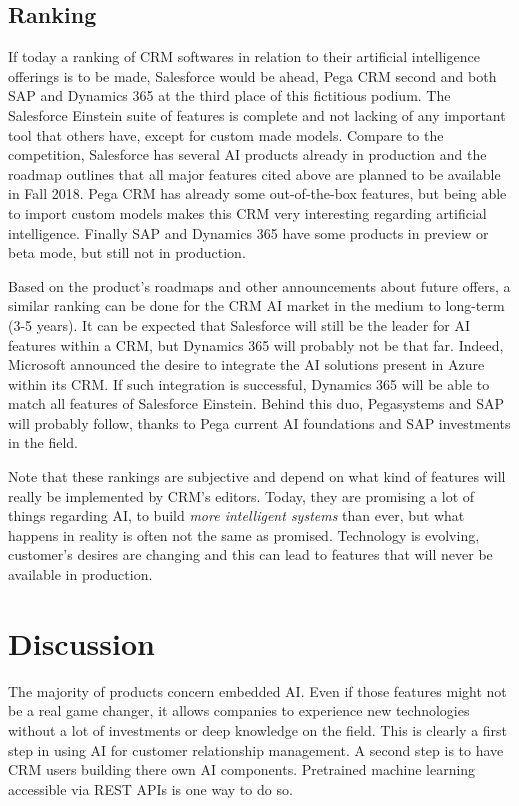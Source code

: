 \subsection{Ranking}
If today a ranking of CRM softwares in relation to their artificial intelligence offerings is to be made, Salesforce would be ahead, Pega CRM second and both SAP and Dynamics 365 at the third place of this fictitious podium. The Salesforce Einstein suite of features is complete and not lacking of any important tool that others have, except for custom made models. Compare to the competition, Salesforce has several AI products already in production and the roadmap outlines that all major features cited above are planned to be available in Fall 2018. Pega CRM has already some out-of-the-box features, but being able to import custom models makes this CRM very interesting regarding artificial intelligence. Finally SAP and Dynamics 365 have some products in preview or beta mode, but still not in production. 

Based on the product's roadmaps and other announcements about future offers, a similar ranking can be done for the CRM AI market in the medium to long-term (3-5 years). It can be expected that Salesforce will still be the leader for AI features within a CRM, but Dynamics 365 will probably not be that far. Indeed, Microsoft announced the desire to integrate the AI solutions present in Azure within its CRM. If such integration is successful, Dynamics 365 will be able to match all features of Salesforce Einstein. Behind this duo, Pegasystems and SAP will probably follow, thanks to Pega current AI foundations and SAP investments in the field. 

Note that these rankings are subjective and depend on what kind of features will really be implemented by CRM's editors. Today, they are promising a lot of things regarding AI, to build \textit{more intelligent systems} than ever, but what happens in reality is often not the same as promised. Technology is evolving, customer's desires are changing and this can lead to features that will never be available in production.

\section{Discussion}\label{sec:crmai-discussion}
The majority of products concern embedded AI. Even if those features might not be a real game changer, it allows companies to experience new technologies without a lot of investments or deep knowledge on the field. This is clearly a first step in using AI for customer relationship management. A second step is to have CRM users building there own AI components. Pretrained machine learning accessible via REST APIs is one way to do so.

